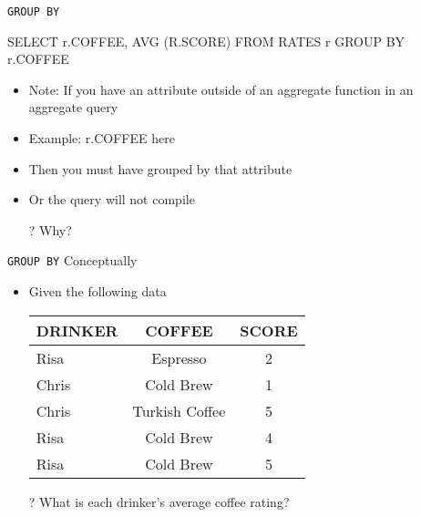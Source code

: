 \documentclass[aspectratio=169]{beamer}
\begin{document}
\begin{frame}[fragile]{\texttt{GROUP BY}}

\begin{SQL}
SELECT r.COFFEE, AVG (R.SCORE)
FROM RATES r
GROUP BY r.COFFEE
\end{SQL}

\begin{itemize}
	\item Note: If you have an attribute outside of an aggregate function in an aggregate query
	\item Example: r.COFFEE here
	\item Then you must have grouped by that attribute
	\item Or the query will not compile
	\item[?] Why?
\end{itemize}	

\end{frame}

\begin{frame}{\texttt{GROUP BY} Conceptually}
\footnotesize{
\begin{itemize}
\item Given the following data
\begin{tabular}{|l|c|c| }  \hline
\textrm{DRINKER} & \textrm{COFFEE} & \textrm{SCORE}\\ \hline
Risa & Espresso & 2\\ \hline
Chris & Cold Brew & 1\\ \hline
Chris & Turkish Coffee & 5 \\ \hline
Risa & Cold Brew & 4 \\ \hline
Risa & Cold Brew & 5 \\ \hline
\end{tabular}
\item[?] What is each drinker's average coffee rating?
\end{itemize}

}
\end{frame}
\end{document}
